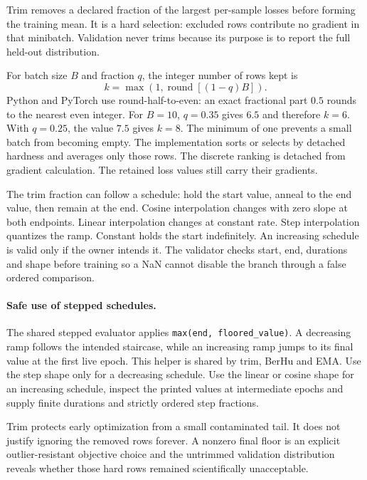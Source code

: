 \documentclass[10pt,aps,prd,twocolumn,nofootinbib]{revtex4-2}
\newcommand{\code}[1]{\texttt{#1}}
\begin{document}
Trim removes a declared fraction of the largest per-sample losses before
forming the training mean.  It is a hard selection: excluded rows contribute
no gradient in that minibatch.  Validation never trims because its purpose is
to report the full held-out distribution.

For batch size \(B\) and fraction \(q\), the integer number of rows kept is
\begin{equation*}
 k=\max\!\left(1,\operatorname{round}[(1-q)B]\right).
\end{equation*}
Python and PyTorch use round-half-to-even: an exact fractional part $0.5$
rounds to the nearest even integer.  For $B=10$, $q=0.35$ gives $6.5$ and
therefore $k=6$.  With $q=0.25$, the value $7.5$ gives $k=8$.  The
minimum of one prevents a small batch from becoming empty.  The implementation
sorts or selects by detached hardness and averages only those rows.  The
discrete ranking is detached from gradient calculation.  The retained loss
values still carry their gradients.

The trim fraction can follow a schedule: hold the start value, anneal to the
end value, then remain at the end.  Cosine interpolation changes with zero
slope at both endpoints.  Linear interpolation changes at constant rate.  Step
interpolation quantizes the ramp.  Constant holds the start indefinitely.  An
increasing schedule is valid only if the owner intends it.  The validator
checks start, end, durations and shape before training so a NaN cannot disable
the branch through a false ordered comparison.

\paragraph{Safe use of stepped schedules.}
The shared stepped evaluator applies \code{max(end, floored\_value)}.  A
decreasing ramp follows the intended staircase, while an increasing ramp jumps
to its final value at the first live epoch.  This helper is shared by trim,
BerHu and EMA.  Use the step shape only for a decreasing schedule.  Use the
linear or cosine shape for an increasing schedule, inspect the printed values
at intermediate epochs and supply finite durations and strictly ordered step
fractions.

Trim protects early optimization from a small contaminated tail.  It does not
justify ignoring the removed rows forever.  A nonzero final floor is an
explicit outlier-resistant objective choice and the untrimmed validation distribution
reveals whether those hard rows remained scientifically unacceptable.
\end{document}
